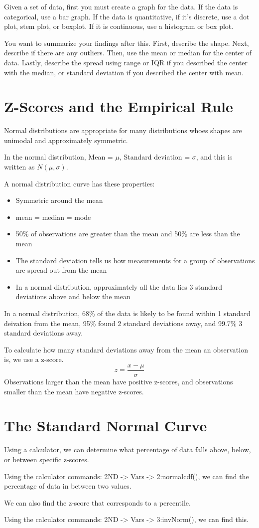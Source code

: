 \documentclass[../stats.tex]{subfiles}
\begin{document}
Given a set of data, first you must create a graph for the data. If the data is categorical, use a bar graph. If the data is quantitative, if it's discrete, use a dot plot, stem plot, or boxplot. If it is continuous, use a histogram or box plot. 

You want to summarize your findings after this. First, describe the shape. Next, describe if there are any outliers. Then, use the mean or median for the center of data. Lastly, describe the spread using range or IQR if you described the center with the median, or standard deviation if you described the center with mean. 
\section{Z-Scores and the Empirical Rule}
Normal distributions are appropriate for many distributions whoes shapes are unimodal and approximately symmetric.

In the normal distribution, Mean = $\mu$, Standard deviation = $\sigma$, and this is written as $N(\mu,\sigma)$.

A normal distribution curve has these properties:
\begin{itemize}
    \item Symmetric around the mean
    \item mean = median = mode
    \item 50\% of observations are greater than the mean and 50\% are less than the mean
    \item The standard deviation tells us how measurements for a group of observations are spread out from the mean
    \item In a normal distribution, approximately all the data lies 3 standard deviations above and below the mean
\end{itemize}
In a normal distribution, 68\% of the data is likely to be found within 1 standard deivation from the mean, 95\% found 2 standard deviations away, and 99.7\% 3 standard deviations away.

To calculate how many standard deviations away from the mean an observation is, we use a z-score.
\[z=\frac{x-\mu}{\sigma}\]
Observations larger than the mean have positive z-scores, and observations smaller than the mean have negative z-scores.
\section{The Standard Normal Curve}
Using a calculator, we can determine what percentage of data falls above, below, or between specific z-scores.

Using the calculator commands: 2ND -> Vars -> 2:normalcdf(), we can find the percentage of data in between two values. 

We can also find the z-score that corresponds to a percentile.

Using the calculator commands: 2ND -> Vars -> 3:invNorm(), we can find this.
\end{document}
